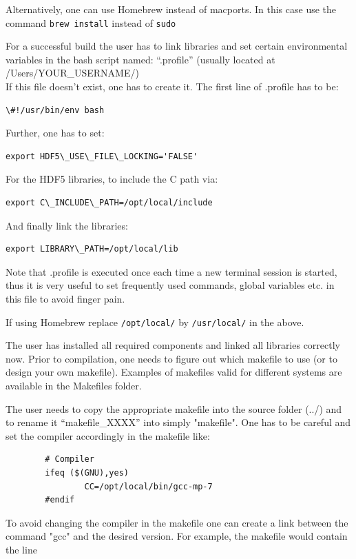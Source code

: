 \documentclass[12pt,english,openany]{scrbook}
\begin{document}
Alternatively, one can use Homebrew instead of macports. In this case use the command \verb|brew install| instead of \verb|sudo|

For a successful build the user has to link libraries and set certain environmental variables in the bash script named: ``.profile''			(usually located at /Users/YOUR\_USERNAME/) \\


If this file doesn't exist, one has to create it. The first line of .profile has to be:
\begin{verbatim} 
\#!/usr/bin/env bash 
\end{verbatim}

Further, one has to set: 
\begin{verbatim} 
export HDF5\_USE\_FILE\_LOCKING='FALSE' 
\end{verbatim}

For the HDF5 libraries, to include the C path via: 
\begin{verbatim} 
export C\_INCLUDE\_PATH=/opt/local/include 
\end{verbatim}

And finally link the libraries: 
\begin{verbatim} 
export LIBRARY\_PATH=/opt/local/lib
\end{verbatim}

Note that .profile is executed once each time a new terminal session is started, thus it is very useful to set frequently used commands, global variables etc. in this file to avoid finger pain. 

If using Homebrew replace \verb|/opt/local/| by \verb|/usr/local/| in the above.


The user has installed all required components and linked all libraries correctly now. 
Prior to compilation, one needs to figure out which makefile to use (or to design your own makefile). Examples of makefiles valid for different systems are available in the Makefiles folder.

The user needs to copy the appropriate makefile into the source folder (../) and to rename it ``makefile\_XXXX'' into simply "makefile". One has to be careful and set the compiler accordingly in the makefile like:
\begin{verbatim} 
		# Compiler
		ifeq ($(GNU),yes)
        		CC=/opt/local/bin/gcc-mp-7
		#endif
\end{verbatim}

To avoid changing the compiler in the makefile one can create a link between the command "gcc" and the desired version. For example, the makefile would contain the line
\end{document}
